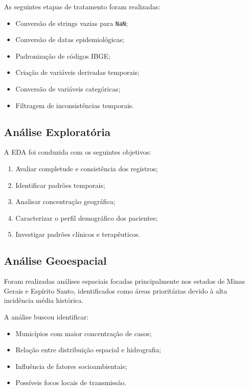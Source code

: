 \documentclass[11pt,a4paper]{article}
\begin{document}
As seguintes etapas de tratamento foram realizadas:

\begin{itemize}
    \item Conversão de strings vazias para \texttt{NaN};
    \item Conversão de datas epidemiológicas;
    \item Padronização de códigos IBGE;
    \item Criação de variáveis derivadas temporais;
    \item Conversão de variáveis categóricas;
    \item Filtragem de inconsistências temporais.
\end{itemize}

\subsection{Análise Exploratória}

A EDA foi conduzida com os seguintes objetivos:

\begin{enumerate}
    \item Avaliar completude e consistência dos registros;
    \item Identificar padrões temporais;
    \item Analisar concentração geográfica;
    \item Caracterizar o perfil demográfico dos pacientes;
    \item Investigar padrões clínicos e terapêuticos.
\end{enumerate}

\subsection{Análise Geoespacial}

Foram realizadas análises espaciais focadas principalmente nos estados de Minas Gerais e Espírito Santo, identificados como áreas prioritárias devido à alta incidência média histórica.

A análise buscou identificar:

\begin{itemize}
    \item Municípios com maior concentração de casos;
    \item Relação entre distribuição espacial e hidrografia;
    \item Influência de fatores socioambientais;
    \item Possíveis focos locais de transmissão.
\end{itemize}
\end{document}
